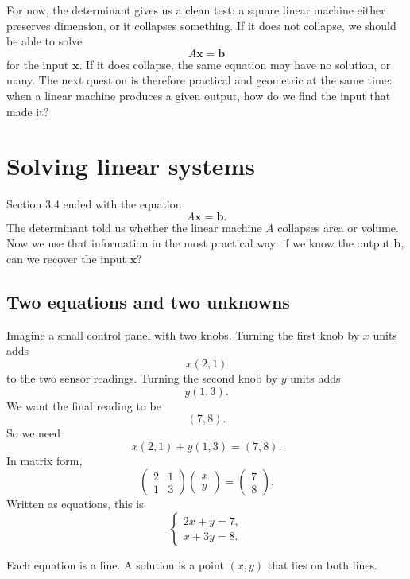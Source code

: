 For now, the determinant gives us a clean test: a square linear machine either preserves
dimension, or it collapses something.  If it does not collapse, we should be able to solve
\[
    A\mathbf x=\mathbf b
\]
for the input \(\mathbf x\).  If it does collapse, the same equation may have no solution,
or many.  The next question is therefore practical and geometric at the same time:
when a linear machine produces a given output, how do we find the input that made it?
\section{Solving linear systems}
\label{sec:3.5}

Section 3.4 ended with the equation
\[
    A\mathbf x=\mathbf b.
\]
The determinant told us whether the linear machine \(A\) collapses area or volume.
Now we use that information in the most practical way: if we know the output
\(\mathbf b\), can we recover the input \(\mathbf x\)?

\subsection{Two equations and two unknowns}

Imagine a small control panel with two knobs.  Turning the first knob by \(x\) units
adds
\[
    x(2,1)
\]
to the two sensor readings.  Turning the second knob by \(y\) units adds
\[
    y(1,3).
\]
We want the final reading to be
\[
    (7,8).
\]
So we need
\[
    x(2,1)+y(1,3)=(7,8).
\]
In matrix form,
\[
    \begin{pmatrix}
        2&1\\
        1&3
    \end{pmatrix}
    \begin{pmatrix}
        x\\y
    \end{pmatrix}
    =
    \begin{pmatrix}
        7\\8
    \end{pmatrix}.
\]
Written as equations, this is
\[
\begin{cases}
2x+y=7,\\
x+3y=8.
\end{cases}
\]

Each equation is a line.  A solution is a point \((x,y)\) that lies on both lines.

